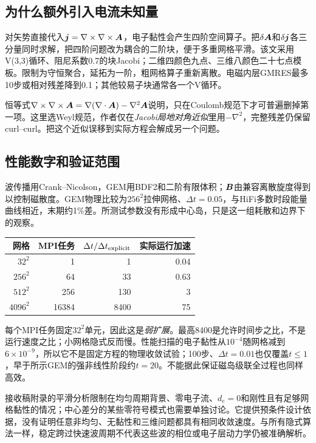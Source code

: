 \documentclass[UTF8,a4paper,11pt,openany,fontset=fandol]{ctexbook}
\begin{document}
\subsection{为什么额外引入电流未知量}
对矢势直接代入$\bm{j}=\nabla\times\nabla\times\bm{A}$，电子黏性会产生四阶空间算子。把$\delta\bm{A}$和$\delta\bm{j}$各三分量同时求解，把四阶问题改为耦合的二阶块，便于多重网格平滑。该文采用V(3,3)循环、阻尼系数0.7的块Jacobi；二维四颜色九点、三维八颜色二十七点模板。限制为守恒聚合，延拓为一阶，粗网格算子重新离散。电磁内层GMRES最多10步或相对残差降到0.1；其他较易子块通常各一个V循环。

恒等式$\nabla\times\nabla\times\bm{A}=\nabla(\nabla\cdot\bm{A})-\nabla^2\bm{A}$说明，只在Coulomb规范下才可普遍删掉第一项。这里选Weyl规范，作者仅在\emph{Jacobi局地对角近似}里用$-\nabla^2$，完整残差仍保留curl--curl。把这个近似误移到实际方程会解成另一个问题。

\subsection{性能数字和验证范围}
波传播用Crank--Nicolson，GEM用BDF2和二阶有限体积；$\bm{B}$由兼容离散旋度得到以控制磁散度。GEM物理比较为$256^2$拉伸网格、$\Delta t=0.05$，与HiFi多数时段能量曲线相近，末期约1\%差。所测试参数没有形成中心岛，只是这一组耗散和边界下的观察。

\begin{center}\small
\begin{tabular}{rrrr}\toprule
网格 & MPI任务 & $\Delta t/\Delta t_{\rm explicit}$ & 实际运行加速\\\midrule
$32^2$ &1&1&0.04\\
$256^2$&64&33&0.63\\
$512^2$&256&130&3\\
$4096^2$&16384&8400&75\\\bottomrule
\end{tabular}\end{center}
每个MPI任务固定$32^2$单元，因此这是\emph{弱扩展}。最高8400是允许时间步之比，不是运行速度之比；小网格隐式反而慢。性能扫描的电子黏性从$10^{-4}$随网格减到$6\times10^{-9}$，所以它不是固定方程的物理收敛试验；100步、$\Delta t=0.01$也仅覆盖$t\leq1$，早于所示GEM的强非线性阶段约$t=20$。不能据此保证磁岛级联全过程也同样高效。

接收稿附录的平滑分析限制在均匀周期背景、零电子流、$d_e=0$和刚性且有足够网格黏性的情况；中心差分的某些零符号模式也需要单独讨论。它提供预条件设计依据，没有证明任意非均匀、无黏性和三维问题都具有相同收敛速度。与所有隐式算法一样，稳定跨过快速波周期不代表这些波的相位或电子层动力学仍被准确解析。
\end{document}
